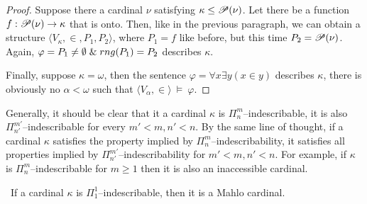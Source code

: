 \begin{proof}
Suppose there a cardinal $\nu$ satisfying $\kappa \leq \mathscr{P} (\nu)$. Let there be a function $f: \mathscr{P} (\nu) \rightarrow \kappa$ that is onto. Then, like in the previous paragraph, we can obtain a structure $\langle V_\kappa, \in, P_1, P_2 \rangle$, where $P_1 = f$ like before, but this time $P_2 = \mathscr{P} (\nu)$. Again, $\varphi = P_1 \neq \emptyset \mathrel{\&} rng(P_1) = P_2$ describes $\kappa$.

Finally, suppose $\kappa = \omega$, then the sentence $\varphi = \forall x \exists y (x \in y)$ describes $\kappa$, 
there is obviously no $\alpha < \omega$ such that $\langle V_\alpha, \in \rangle~\models~\varphi$.

\end{proof}

Generally, it should be clear that it a cardinal $\kappa$ is $\Pi^m_n$–indescribable, it is also $\Pi^{m'}_{n'}$–indescribable for every $m'<m, n'<n$. By the same line of thought, if a cardinal $\kappa$ satisfies the property implied by $\Pi^m_n$–indescribability, it satisfies all properties implied by $\Pi^{m'}_{n'}$–indescribability for $m'<m, n'<n$. For example, if $\kappa$ is $\Pi^m_n$–indescribable for $m \geq 1$ then it is also an inaccessible cardinal.


\begin{theorem}\
If a cardinal $\kappa$ is $\Pi^1_1$–indescribable, then it is a Mahlo cardinal.
\end{theorem}

